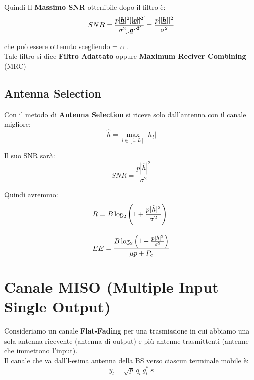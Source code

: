 Quindi Il \textbf{Massimo SNR} ottenibile dopo il filtro è:
\begin{equation*}
    SNR =\frac{p|\pmb{\underline{h}}|^2 \cancel{||\pmb{\underline{c}}||^2} }{\sigma^2 \cancel{||\pmb{\underline{c}}||^2}} = \frac{p||\pmb{\underline{h}}||^2}{\sigma^2}
\end{equation*}

che può essere ottenuto scegliendo  = $\alpha$ .\\

Tale filtro si dice \textbf{Filtro Adattato} oppure \textbf{Maximum Reciver Combining} (MRC)
\\

\subsection{Antenna Selection}
Con il metodo di \textbf{Antenna Selection} si riceve solo dall'antenna con il canale migliore:
\begin{equation*}
    \hat{h} = \max_{l\in[1,L]} |h_l|
\end{equation*}

Il suo SNR sarà:
\begin{equation*}
    SNR = \frac{p|\hat{h}|^2}{\sigma^2}
\end{equation*}

Quindi avremmo:
\begin{equation*}
    \begin{aligned}
    &R = B\log_2\left(1 + \frac{p|\hat{h}|^2}{\sigma^2}\right)
    \\[10pt]
    &EE = \frac{B\log_2\left(1 + \frac{p|\hat{h}|^2}{\sigma^2}\right)}{\mu p + P_c}
    \end{aligned}
\end{equation*}
\pagebreak 


\section{Canale MISO (Multiple Input Single Output)}
Consideriamo un canale \textbf{Flat-Fading} per una trasmissione in cui abbiamo una sola antenna ricevente (antenna di output) e più antenne trasmittenti (antenne che immettono l'input).\\

Il canale che va dall'l-esima antenna della BS verso ciascun terminale mobile è:
\begin{equation*}
    y_l = \sqrt{p} \ q_l \ g_l^* \ s
\end{equation*}

